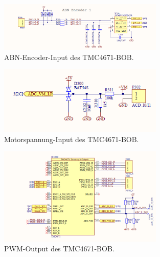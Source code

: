 \begin{figure}[H]
	\centering
	\includegraphics[width=0.7\textwidth]{graphics/TMC4671_ABN_Encoder_BOB_Schematic}
	\caption{ABN-Encoder-Input des TMC4671-BOB. \cite[S.3]{trinamicmotion_control_gmbh__co_kg_tmc4671-bob_2020}}
	\label{fig:Schema_ABN_Encoder_FOC_Treiber}
\end{figure} 


\begin{figure}[H]
	\centering
	\includegraphics[width=0.7\textwidth]{graphics/TMC4671_Motorspannung_BOB_Schematic}
	\caption{Motorspannung-Input des TMC4671-BOB. \cite[S.4]{trinamicmotion_control_gmbh__co_kg_tmc4671-bob_2020}}
	\label{fig:Schema_Motorspannung_FOC_Treiber}
\end{figure} 

\begin{figure}[H]
	\centering
	\includegraphics[width=0.7\textwidth]{graphics/TMC4671_PWM_BOB_Schematic}
	\caption{PWM-Output des TMC4671-BOB. \cite[S.3]{trinamicmotion_control_gmbh__co_kg_tmc4671-bob_2020}}
	\label{fig:Schema_PWM_FOC_Treiber}
\end{figure} 

